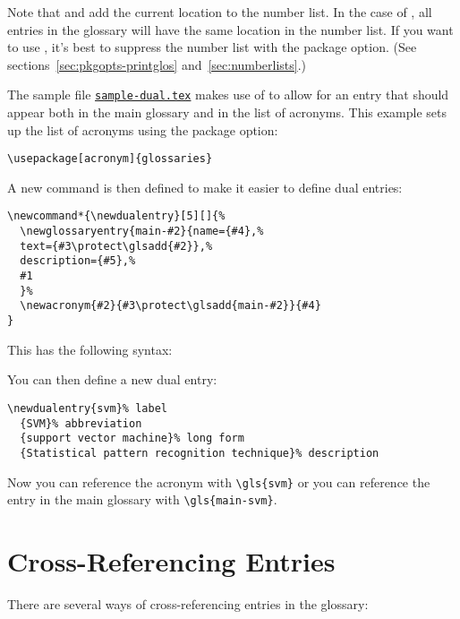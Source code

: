 \documentclass[report]{nlctdoc}
\newcommand*{\samplefile}[1]{\hyperref[ex:sample#1]{\texttt{sample#1.tex}}}
\begin{document}
\begin{important}
Note that  and  add the current location to
the number list. In the case of , all entries in the
glossary will have the same location in the number list. If you want
to use , it's best to suppress the number list with
the  package option. (See
sections~\ref{sec:pkgopts-printglos} and~\ref{sec:numberlists}.)
\end{important}

The sample file \samplefile{-dual} makes use of  to
allow for an entry that should appear both in the main glossary and
in the list of acronyms. This example sets up the list of acronyms
using the  package option:
\begin{verbatim}
\usepackage[acronym]{glossaries}
\end{verbatim}
A new command is then defined to make it easier to define dual
entries:
\begin{verbatim}
\newcommand*{\newdualentry}[5][]{%
  \newglossaryentry{main-#2}{name={#4},%
  text={#3\protect\glsadd{#2}},%
  description={#5},%
  #1
  }%
  \newacronym{#2}{#3\protect\glsadd{main-#2}}{#4}
}
\end{verbatim}
This has the following syntax:
\begin{definition}
\end{definition}
You can then define a new dual entry:
\begin{verbatim}
\newdualentry{svm}% label
  {SVM}% abbreviation
  {support vector machine}% long form
  {Statistical pattern recognition technique}% description
\end{verbatim}
Now you can reference the acronym with \verb|\gls{svm}| or you can
reference the entry in the main glossary with \verb|\gls{main-svm}|.

\chapter{Cross-Referencing Entries}
\label{sec:crossref}

There are several ways of cross-referencing entries in the 
glossary: 
\end{document}
